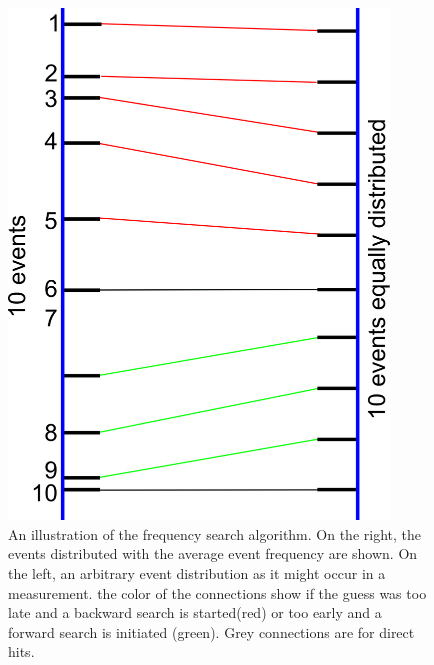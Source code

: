       \begin{figure}
	\begin{minipage}{0.49\textwidth}
		\centering
      	\includegraphics[width = 0.9\textwidth]{graphics/search/frequencySearch.png}
      	\caption[Frequency search algorithm]{An illustration of the frequency search algorithm. On the right, the events distributed with the average event frequency are shown. On the left, an arbitrary event distribution as it might occur in a measurement. the color of the connections show if the guess was too late and a backward search is started(red) or too early and a forward search is initiated (green). Grey connections are for direct hits.}
	\end{minipage}
	\hfill
	\begin{minipage}{0.49\textwidth}
		\hspace{0.25 cm}

\end{minipage}
\end{figure}

